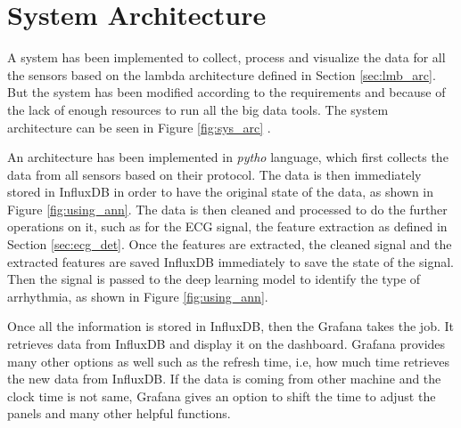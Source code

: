 \section{System Architecture}
A system has been implemented to collect, process and visualize the data for all the sensors based on the lambda architecture defined in Section \ref{sec:lmb_arc}. But the system has been modified according to the requirements and because of the lack of enough resources to run all the big data tools. The system architecture can be seen in Figure \ref{fig:sys_arc} .

An architecture has been implemented in \textit{pytho} language, which first collects the data from all sensors based on their protocol. The data is then immediately stored in InfluxDB in order to have the original state of the data, as shown in Figure \ref{fig:using_ann}. The data is then cleaned and processed to do the further operations on it, such as for the ECG signal, the feature extraction as defined in Section \ref{sec:ecg_det}. Once the features are extracted, the cleaned signal and the extracted features are saved InfluxDB immediately to save the state of the signal. Then the signal is passed to the deep learning model to identify the type of arrhythmia, as shown in Figure \ref{fig:using_ann}.

Once all the information is stored in InfluxDB, then the Grafana takes the job. It retrieves data from InfluxDB and display it on the dashboard. Grafana provides many other options as well such as the refresh time, i.e, how much time retrieves the new data from InfluxDB. If the data is coming from other machine and the clock time is not same, Grafana gives an option to shift the time to adjust the panels and many other helpful functions.


